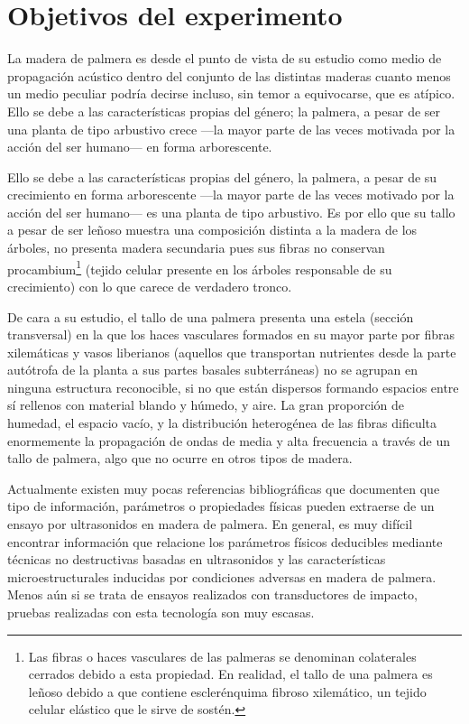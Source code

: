 \section{Objetivos del experimento}

La madera de palmera es desde el punto de vista de su estudio como medio de
propagación acústico dentro del conjunto de las distintas maderas cuanto
menos un medio peculiar podría decirse incluso, sin temor a equivocarse,
que es atípico. Ello se debe a las características propias del género; la
palmera, a pesar de ser una planta de tipo arbustivo crece ---la mayor
parte de las veces motivada por la acción del ser humano--- en forma
arborescente.

Ello se debe a las características propias del género, la palmera, a pesar
de su crecimiento en forma arborescente ---la mayor parte de las veces
motivado por la acción del ser humano--- es una planta de tipo arbustivo.
Es por ello que su tallo a pesar de ser leñoso muestra una composición
distinta a la madera de los árboles, no presenta madera secundaria pues sus
fibras no conservan procambium\footnote{Las fibras o haces vasculares de
las palmeras se denominan colaterales cerrados debido a esta propiedad. En
realidad, el tallo de una palmera es leñoso debido a que contiene
esclerénquima fibroso xilemático, un tejido celular elástico que le sirve
de sostén.} (tejido celular presente en los árboles responsable de su
crecimiento) con lo que carece de verdadero tronco.

De cara a su estudio, el tallo de una palmera presenta una estela (sección
transversal) en la que los haces vasculares formados en su mayor parte por
fibras xilemáticas y vasos liberianos (aquellos que transportan nutrientes
desde la parte autótrofa de la planta a sus partes basales subterráneas) no
se agrupan en ninguna estructura reconocible, si no que están dispersos
formando espacios entre sí rellenos con material blando y húmedo, y aire.
La gran proporción de humedad, el espacio vacío, y la distribución
heterogénea de las fibras dificulta enormemente la propagación de ondas de
media y alta frecuencia a través de un tallo de palmera, algo que no ocurre
en otros tipos de madera.

Actualmente existen muy pocas referencias bibliográficas que documenten que
tipo de información, parámetros o propiedades físicas pueden extraerse de
un ensayo por ultrasonidos en madera de palmera. En general, es muy difícil
encontrar información que relacione los parámetros físicos deducibles
mediante técnicas no destructivas basadas en ultrasonidos y las
características microestructurales inducidas por condiciones adversas en
madera de palmera. Menos aún si se trata de ensayos realizados con
transductores de impacto, pruebas realizadas con esta tecnología son muy
escasas.


